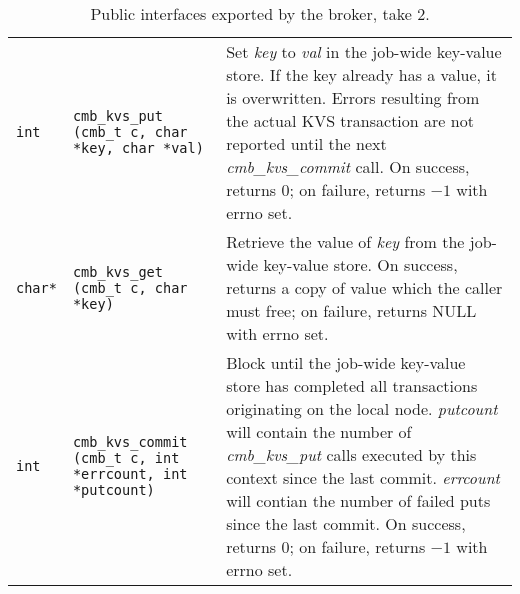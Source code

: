 \begin{table}
\begin{tabular}{|p{0.7cm}p{5cm}|p{9cm}|}
\hline
{\tt int}
  & {\tt cmb\_kvs\_put (cmb\_t c, char {*key}, char {*val})}
  & Set {\em key} to {\em val} in the job-wide key-value store.
    If the key already has a value, it is overwritten.
    Errors resulting from the actual KVS transaction are not reported
    until the next {\em cmb\_kvs\_commit} call.
    On success, returns $0$; on failure, returns $-1$ with errno set.\\
{\tt {char*}}
  & {\tt cmb\_kvs\_get (cmb\_t c, char {*key})}
  & Retrieve the value of {\em key} from the job-wide key-value store.
    On success, returns a copy of value which the caller must free;
    on failure, returns NULL with errno set.\\
{\tt int}
  & {\tt cmb\_kvs\_commit (cmb\_t c, int *errcount, int *putcount)}
  & Block until the job-wide key-value store has completed all transactions
    originating on the local node.  {\em putcount} will contain the number
    of {\em cmb\_kvs\_put} calls executed by this context since the last commit.
    {\em errcount} will contian the number of failed puts since the last commit.
    On success, returns $0$; on failure, returns $-1$ with errno set.\\
\hline
\end{tabular}
\caption{Public interfaces exported by the broker, take 2.}
\label{tab:cmbapi2}
\end{table}
